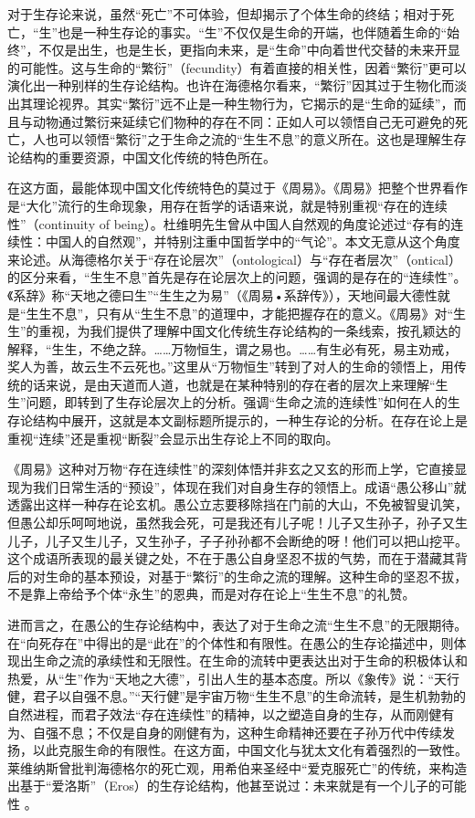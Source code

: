 \documentclass[UTF8, 12pt, a4paper]{ctexrep}
\begin{document}
对于生存论来说，虽然“死亡”不可体验，但却揭示了个体生命的终结；相对于死亡，“生”也是一种生存论的事实。“生”不仅仅是生命的开端，也伴随着生命的“始终”，不仅是出生，也是生长，更指向未来，是“生命”中向着世代交替的未来开显的可能性。这与生命的“繁衍”（fecundity）有着直接的相关性，因着“繁衍”更可以演化出一种别样的生存论结构。也许在海德格尔看来，“繁衍”因其过于生物化而淡出其理论视界。其实“繁衍”远不止是一种生物行为，它揭示的是“生命的延续”，而且与动物通过繁衍来延续它们物种的存在不同：正如人可以领悟自己无可避免的死亡，人也可以领悟“繁衍”之于生命之流的“生生不息”的意义所在。这也是理解生存论结构的重要资源，中国文化传统的特色所在。

在这方面，最能体现中国文化传统特色的莫过于《周易》。《周易》把整个世界看作是“大化”流行的生命现象，用存在哲学的话语来说，就是特别重视“存在的连续性”（continuity of being）。杜维明先生曾从中国人自然观的角度论述过“存有的连续性：中国人的自然观”，并特别注重中国哲学中的“气论”。本文无意从这个角度来论述。从海德格尔关于“存在论层次”（ontological）与“存在者层次”（ontical）的区分来看，“生生不息”首先是存在论层次上的问题，强调的是存在的“连续性”。《系辞》称“天地之德曰生”“生生之为易”（《周易•系辞传》），天地间最大德性就是“生生不息”，只有从“生生不息”的道理中，才能把握存在的意义。《周易》对“生生”的重视，为我们提供了理解中国文化传统生存论结构的一条线索，按孔颖达的解释，“生生，不绝之辞。……万物恒生，谓之易也。……有生必有死，易主劝戒，奖人为善，故云生不云死也。”这里从“万物恒生”转到了对人的生命的领悟上，用传统的话来说，是由天道而人道，也就是在某种特别的存在者的层次上来理解“生生”问题，即转到了生存论层次上的分析。强调“生命之流的连续性”如何在人的生存论结构中展开，这就是本文副标题所提示的，一种生存论的分析。在存在论上是重视“连续”还是重视“断裂”会显示出生存论上不同的取向。

《周易》这种对万物“存在连续性”的深刻体悟并非玄之又玄的形而上学，它直接显现为我们日常生活的“预设”，体现在我们对自身生存的领悟上。成语“愚公移山”就透露出这样一种存在论玄机。愚公立志要移除挡在门前的大山，不免被智叟讥笑，但愚公却乐呵呵地说，虽然我会死，可是我还有儿子呢！儿子又生孙子，孙子又生儿子，儿子又生儿子，又生孙子，子子孙孙都不会断绝的呀！他们可以把山挖平。这个成语所表现的最关键之处，不在于愚公自身坚忍不拔的气势，而在于潜藏其背后的对生命的基本预设，对基于“繁衍”的生命之流的理解。这种生命的坚忍不拔，不是靠上帝给予个体“永生”的恩典，而是对存在论上“生生不息”的礼赞。

进而言之，在愚公的生存论结构中，表达了对于生命之流“生生不息”的无限期待。在“向死存在”中得出的是“此在”的个体性和有限性。在愚公的生存论描述中，则体现出生命之流的承续性和无限性。在生命的流转中更表达出对于生命的积极体认和热爱，从“生”作为“天地之大德”，引出人生的基本态度。所以《象传》说：“天行健，君子以自强不息。”“天行健”是宇宙万物“生生不息”的生命流转，是生机勃勃的自然进程，而君子效法“存在连续性”的精神，以之塑造自身的生存，从而刚健有为、自强不息；不仅是自身的刚健有为，这种生命精神还要在子孙万代中传续发扬，以此克服生命的有限性。在这方面，中国文化与犹太文化有着强烈的一致性。莱维纳斯曾批判海德格尔的死亡观，用希伯来圣经中“爱克服死亡”的传统，来构造出基于“爱洛斯”（Eros）的生存论结构，他甚至说过：未来就是有一个儿子的可能性 。
\end{document}
